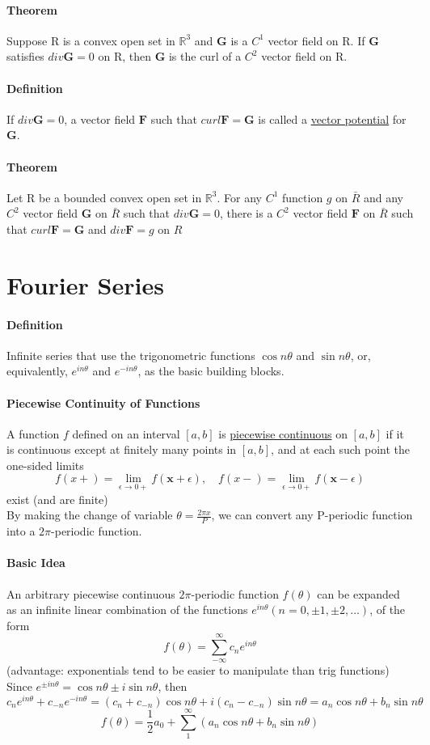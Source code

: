 \documentclass[11pt]{article}
\newcommand{\tb}[1]{\textbf{#1}}
\newcommand{\real}[0]{\mathbb{R}}
\newcommand{\under}[1]{\underline{#1}}
\newcommand{\vx}[0]{\tb{x}}
\newcommand{\vf}[0]{\tb{F}}
\newcommand{\vg}[0]{\tb{G}}
\begin{document}
\paragraph{Theorem} Suppose R is a convex open set in $\real^3$ and $\vg$ is a $C^1$ vector field on R. If $\vg$ satisfies $div \vg = 0$ on R, then $\vg$ is the curl of a $C^2$ vector field on R.
\paragraph{Definition} If $div \vg = 0$, a vector field $\vf$ such that $curl \vf = \vg$ is called a \under{vector potential} for $\vg$.
\paragraph{Theorem} Let R be a bounded convex open set in $\real^3$. For any $C^1$ function $g$ on $\bar{R}$ and any $C^2$ vector field $\vg$ on $\bar{R}$ such that $div \vg = 0$, there is a $C^2$ vector field $\vf$ on $\bar{R}$ such that $curl \vf = \vg$ and $div \vf = g$ on $R$
\section{Fourier Series}
\paragraph{Definition} Infinite series that use the trigonometric functions $\cos n\theta$ and $\sin n\theta$, or, equivalently, $e^{in\theta}$ and $e^{-in\theta}$, as the basic building blocks.
\paragraph{Piecewise Continuity of Functions} A function $f$ defined on an interval $[a,b]$ is \under{piecewise continuous} on $[a,b]$ if it is continuous except at finitely many points in $[a,b]$, and at each such point the one-sided limits
$$f(x+) = \underset{\epsilon \rightarrow 0+}{\lim} f(\vx + \epsilon), \quad f(x-)=\underset{\epsilon \rightarrow 0+}{\lim} f(\vx - \epsilon)$$
exist (and are finite)\\
By making the change of variable $\theta = \frac{2\pi x}{P}$, we can convert any P-periodic function into a $2\pi$-periodic function. 
\paragraph{Basic Idea} An arbitrary piecewise continuous $2\pi$-periodic function $f(\theta)$ can be expanded as an infinite linear combination of the functions $e^{in\theta}(n = 0,\pm 1, \pm 2,\hdots)$, of the form
$$f(\theta) = \sum_{-\infty}^{\infty}c_ne^{in\theta}$$
(advantage: exponentials tend to be easier to manipulate than trig functions)\\
Since $e^{\pm in\theta} = \cos n\theta \pm i \sin n \theta$, then $c_ne^{in\theta} + c_{-n}e^{-in\theta} = (c_n + c_{-n})\cos n \theta + i(c_n - c_{-n}) \sin n\theta = a_n\cos n \theta + b_n \sin n\theta$
$$f(\theta) = \frac{1}{2}a_0 + \sum_1^\infty(a_n\cos n\theta+b_n \sin n\theta)$$
\end{document}
